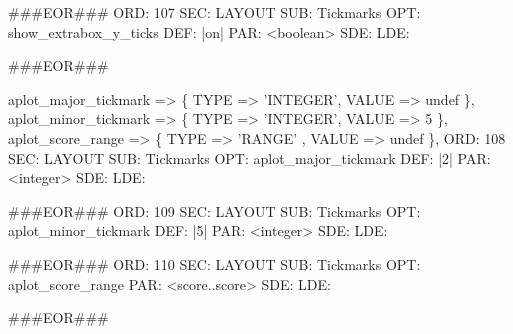 \documentclass[11pt]{article}
\def\nwendcode{\endtrivlist \endgroup} %
\let\nwdocspar=\par                    %
\begin{document}
###EOR###
ORD: 107
SEC: LAYOUT
SUB: Tickmarks
OPT: show_extrabox_y_ticks
DEF: |on|
PAR: <boolean>
SDE: 
LDE: 

###EOR###
\nwendcode{}\nwdocspar

\nwenddocs{}\plusendmoddef
aplot_major_tickmark       => \{ TYPE => 'INTEGER', VALUE => undef  \},
aplot_minor_tickmark       => \{ TYPE => 'INTEGER', VALUE => 5      \},
aplot_score_range          => \{ TYPE => 'RANGE'  , VALUE => undef  \},
\eatline
{}\nwendcode{}\plusendmoddef
ORD: 108
SEC: LAYOUT
SUB: Tickmarks
OPT: aplot_major_tickmark
DEF: |2|
PAR: <integer>
SDE: 
LDE: 

###EOR###
ORD: 109
SEC: LAYOUT
SUB: Tickmarks
OPT: aplot_minor_tickmark
DEF: |5|
PAR: <integer>
SDE: 
LDE: 

###EOR###
ORD: 110
SEC: LAYOUT
SUB: Tickmarks
OPT: aplot_score_range
PAR: <score..score>
SDE: 
LDE: 

###EOR###
\nwendcode{}\nwdocspar
\end{document}
